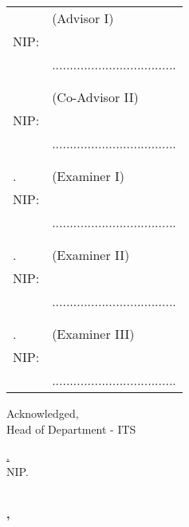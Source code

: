 \noindent
\begin{tabularx}{\textwidth}{X l}
  \advisor{}               & (Advisor I)                         \\
  NIP: \advisornip{}       &                                     \\
                           & ................................... \\
                           &                                     \\
                           &                                     \\
  \coadvisor{}             & (Co-Advisor II)                     \\
  NIP: \coadvisornip{}     &                                     \\
                           & ................................... \\
                           &                                     \\
                           &                                     \\
  \examinerone{}.          & (Examiner I)                        \\
  NIP: \examineronenip{}   &                                     \\
                           & ................................... \\
                           &                                     \\
                           &                                     \\
  \examinertwo{}.          & (Examiner II)                       \\
  NIP: \examinertwonip{}   &                                     \\
                           & ................................... \\
                           &                                     \\
                           &                                     \\
  \examinerthree{}.        & (Examiner III)                      \\
  NIP: \examinerthreenip{} &                                     \\
                           & ................................... \\
\end{tabularx}
\endgroup


\begin{center}
  Acknowledged, \\
  Head of \engdepartment{} Department \engfacultyshort{} - ITS \\

  \vspace{8ex}

  \underline{\headofdepartment{}.} \\
  NIP. \headofdepartmentnip{}
\end{center}

\begin{center}
  \textbf{\MakeUppercase{\place{}}\\\ENGMONTH{}, \the\year{}}
\end{center}
\endgroup
